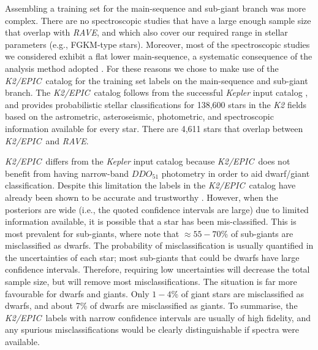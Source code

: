 \documentclass[preprint,trackchanges]{aastex}
\newcommand{\acronym}[1]{{\small{#1}}}
\newcommand{\project}[1]{\textsl{#1}}
\newcommand{\rave}{\project{\acronym{RAVE}}}
\newcommand{\epic}{\project{K2/EPIC}}
\begin{document}
Assembling a training set for the main-sequence and sub-giant branch was more complex.
There are no spectroscopic studies that have a large enough sample size that overlap 
with \rave, and which also cover our required range in stellar parameters 
(e.g., FGKM-type stars).  Moreover, most of the spectroscopic studies we considered 
exhibit a flat lower main-sequence, a systematic consequence of the analysis method 
adopted \citep[e.g., see][for a discussion]{Bensby_2014}.  For these reasons we chose
to make use of the \epic\ catalog \citep{Huber_2016} for the training set labels on
the main-sequence and sub-giant branch.  The \epic\ catalog follows from the successful
\project{Kepler} input catalog \citep{Brown_2011}, and provides probabilistic stellar 
classifications for 138,600 stars in the \project{K2} fields based on the 
astrometric, asteroseismic, photometric, and spectroscopic information available for
every star.  There are 4,611 stars that overlap between \epic\ and \rave.


\epic\ differs from the \project{Kepler} input catalog because \epic\ does not 
benefit from having narrow-band $DDO_{51}$ photometry in order to aid dwarf/giant 
classification.  Despite this limitation the labels in the \epic\ catalog have 
already been shown to be accurate and trustworthy \citep{Huber_2016}.  However, 
when the posteriors are wide (i.e., the quoted confidence intervals are large) 
due to limited information available, it is possible that a star has been 
mis-classified.  This is most prevalent for sub-giants, where \citet{Huber_2016} 
note that $\approx55-70$\% of sub-giants are misclassified as dwarfs.  The 
probability of misclassification is usually quantified in the uncertainties of 
each star; most sub-giants that could be dwarfs have large confidence intervals.  
Therefore, requiring low uncertainties will decrease the total sample size, but 
will remove most misclassifications.  The situation is far more favourable for 
dwarfs and giants.  Only $1-4$\% of giant stars are misclassified as dwarfs, and 
about 7\% of dwarfs are misclassified as giants.  To summarise, the \epic\ labels 
with narrow confidence intervals are usually of high fidelity, and any spurious 
misclassifications would be clearly distinguishable if spectra were available. 
\end{document}
